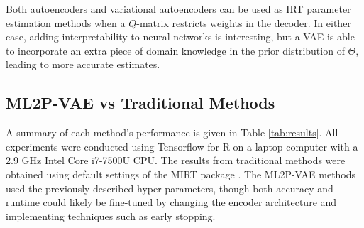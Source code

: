 Both autoencoders and variational autoencoders can be used as IRT parameter estimation methods when a $Q$-matrix restricts weights in the decoder. In either case, adding interpretability to neural networks is interesting, but a VAE is able to incorporate an extra piece of domain knowledge in the prior distribution of $\Theta$, leading to more accurate estimates.


\subsection{ML2P-VAE vs Traditional Methods}
A summary of each method's performance is given in Table \ref{tab:results}. All experiments were conducted using Tensorflow for R on a laptop computer with a 2.9 GHz Intel Core i7-7500U CPU. The results from traditional methods were obtained using default settings of the MIRT package \cite{mirt}. The ML2P-VAE methods used the previously described hyper-parameters, though both accuracy and runtime could likely be fine-tuned by changing the encoder architecture and implementing techniques such as early stopping.



